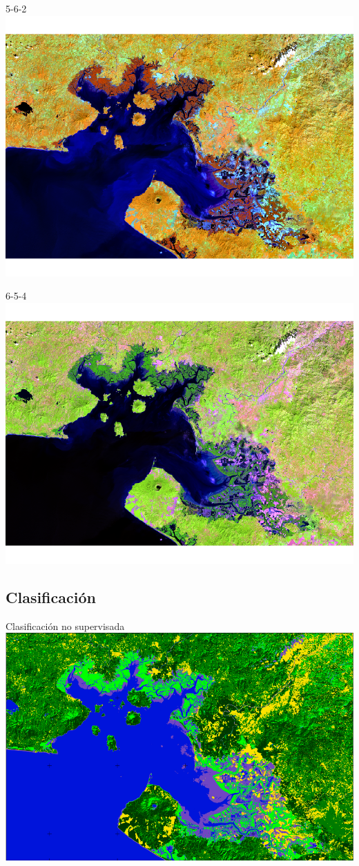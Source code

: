 \documentclass[12pt]{beamer}
\begin{document}
\begin{frame}{{\footnotesize 5-6-2}}
	\centering
	\includegraphics[width=0.8\linewidth]{./Imagenes/GF562.png}
\end{frame}

\begin{frame}{{\footnotesize 6-5-4}}
	\centering
	\includegraphics[width=0.8\linewidth]{./Imagenes/GF654.png}
\end{frame}

\subsection{Clasificación}
\begin{frame}{\footnotesize Clasificación no supervisada}
	\centering
	\includegraphics[width=0.8\linewidth]{./Imagenes/Classnosup.png}
\end{frame}
\end{document}
